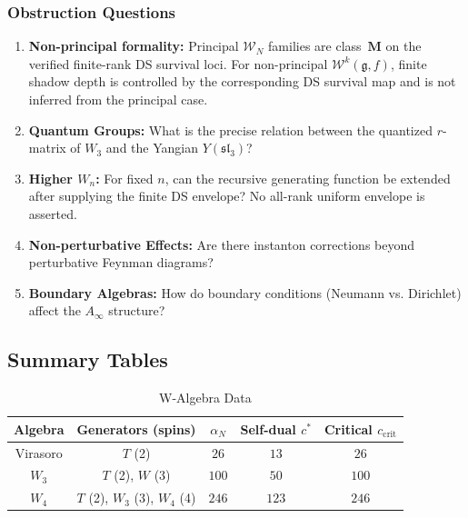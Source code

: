 \subsubsection{Obstruction Questions}

\begin{enumerate}
\item \textbf{Non-principal formality:} Principal $\mathcal{W}_N$
families are class~$\mathbf{M}$ on the verified finite-rank DS
survival loci. For non-principal $\mathcal{W}^k(\mathfrak{g}, f)$,
finite shadow depth is controlled by the corresponding DS survival
map and is not inferred from the principal case.

\item \textbf{Quantum Groups:} What is the precise relation between the quantized $r$-matrix of $W_3$ and the Yangian $Y(\mathfrak{sl}_3)$?

\item \textbf{Higher $W_n$:} For fixed $n$, can the recursive
generating function be extended after supplying the finite DS envelope?
No all-rank uniform envelope is asserted.

\item \textbf{Non-perturbative Effects:} Are there instanton corrections beyond perturbative Feynman diagrams?

\item \textbf{Boundary Algebras:} How do boundary conditions (Neumann vs. Dirichlet) affect the $A_\infty$ structure?
\end{enumerate}

\subsection{Summary Tables}

\begin{table}[h]
\centering
\caption{W-Algebra Data}
\begin{tabular}{|c|c|c|c|c|}
\hline
Algebra & Generators (spins) & $\alpha_N$ & Self-dual $c^*$ & Critical $c_{\mathrm{crit}}$ \\
\hline
Virasoro & $T$ (2) & $26$ & $13$ & $26$ \\
$W_3$ & $T$ (2), $W$ (3) & $100$ & $50$ & $100$ \\
$W_4$ & $T$ (2), $W_3$ (3), $W_4$ (4) & $246$ & $123$ & $246$ \\
\hline
\end{tabular}
\end{table}

